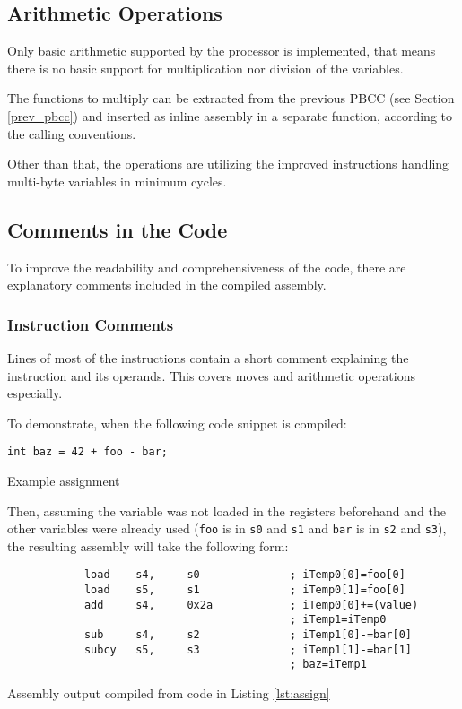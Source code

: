         \subsection{Arithmetic Operations}

        Only basic arithmetic supported by the processor is implemented, that means there is no basic support for multiplication nor division of the variables.

        The functions to multiply can be extracted from the previous PBCC (see Section \ref{prev_pbcc}) and inserted as inline assembly in a separate function, according to the calling conventions.

        Other than that, the operations are utilizing the improved instructions handling multi-byte variables in minimum cycles.

        \subsection{Comments in the Code}

        To improve the readability and comprehensiveness of the code, there are explanatory comments included in the compiled assembly.

            \subsubsection{Instruction Comments}

            Lines of most of the instructions contain a short comment explaining the instruction and its operands. This covers moves and arithmetic operations especially.

            To demonstrate, when the following code snippet is compiled:

            \begin{listing}
            \centering
            \texttt{int baz = 42 + foo - bar;}
            \caption{Example assignment}\label{lst:assign}
            \end{listing}

            Then, assuming the variable was not loaded in the registers beforehand and the other variables were already used (\texttt{foo} is in \texttt{s0} and \texttt{s1} and \texttt{bar} is in \texttt{s2} and \texttt{s3}), the resulting assembly will take the following form:

            \begin{listing}
            \centering
            \begin{verbatim}
            load    s4,     s0              ; iTemp0[0]=foo[0]
            load    s5,     s1              ; iTemp0[1]=foo[0]
            add     s4,     0x2a            ; iTemp0[0]+=(value)
                                            ; iTemp1=iTemp0
            sub     s4,     s2              ; iTemp1[0]-=bar[0]
            subcy   s5,     s3              ; iTemp1[1]-=bar[1]
                                            ; baz=iTemp1
            \end{verbatim}
            \caption{Assembly output compiled from code in Listing \ref{lst:assign}}\label{lst:assignasm}
            \end{listing}

